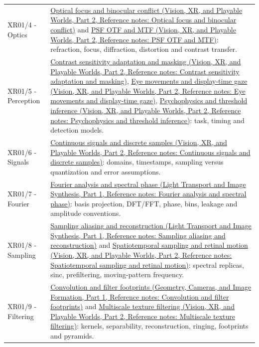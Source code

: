 {\begin{longtable}[]{@{}
  >{\raggedright\arraybackslash}p{}
  >{\raggedright\arraybackslash}p{}@{}}
XR01/4 - Optics & \href{../07-Vision-XR-and-Playable-Worlds-P02/main.pdf\#appendix-f90cee1be7a4}{Optical focus and binocular conflict (Vision, XR, and Playable Worlds, Part 2, Reference notes: Optical focus and binocular conflict)} and \href{../07-Vision-XR-and-Playable-Worlds-P02/main.pdf\#appendix-8b76b0efd27f}{PSF OTF and MTF (Vision, XR, and Playable Worlds, Part 2, Reference notes: PSF OTF and MTF)}: refraction, focus, diffraction, distortion and contrast transfer. \\
XR01/5 - Perception & \href{../07-Vision-XR-and-Playable-Worlds-P02/main.pdf\#appendix-b3aa9e8e01ad}{Contrast sensitivity adaptation and masking (Vision, XR, and Playable Worlds, Part 2, Reference notes: Contrast sensitivity adaptation and masking)}, \href{../07-Vision-XR-and-Playable-Worlds-P02/main.pdf\#appendix-a6f2c4fe1996}{Eye movements and display-time gaze (Vision, XR, and Playable Worlds, Part 2, Reference notes: Eye movements and display-time gaze)}, \href{../07-Vision-XR-and-Playable-Worlds-P02/main.pdf\#appendix-1759f03e8ce7}{Psychophysics and threshold inference (Vision, XR, and Playable Worlds, Part 2, Reference notes: Psychophysics and threshold inference)}: task, timing and detection models. \\
XR01/6 - Signals & \href{../07-Vision-XR-and-Playable-Worlds-P02/main.pdf\#appendix-1077ea8fc737}{Continuous signals and discrete samples (Vision, XR, and Playable Worlds, Part 2, Reference notes: Continuous signals and discrete samples)}: domains, timestamps, sampling versus quantization and error assumptions. \\
XR01/7 - Fourier & \href{../04-Light-Transport-and-Image-Synthesis-P01/main.pdf\#appendix-b60686ba06a1}{Fourier analysis and spectral phase (Light Transport and Image Synthesis, Part 1, Reference notes: Fourier analysis and spectral phase)}: basis projection, DFT/FFT, phase, bins, leakage and amplitude conventions. \\
XR01/8 - Sampling & \href{../04-Light-Transport-and-Image-Synthesis-P01/main.pdf\#appendix-6a7869dd79a6}{Sampling aliasing and reconstruction (Light Transport and Image Synthesis, Part 1, Reference notes: Sampling aliasing and reconstruction)} and \href{../07-Vision-XR-and-Playable-Worlds-P02/main.pdf\#appendix-70895739febb}{Spatiotemporal sampling and retinal motion (Vision, XR, and Playable Worlds, Part 2, Reference notes: Spatiotemporal sampling and retinal motion)}: spectral replicas, sinc, prefiltering, moving-pattern frequency. \\
XR01/9 - Filtering & \href{../03-Geometry-Cameras-and-Image-Formation-P01/main.pdf\#appendix-d5b3c692d9f0}{Convolution and filter footprints (Geometry, Cameras, and Image Formation, Part 1, Reference notes: Convolution and filter footprints)} and \href{../07-Vision-XR-and-Playable-Worlds-P02/main.pdf\#appendix-b677a85ba76f}{Multiscale texture filtering (Vision, XR, and Playable Worlds, Part 2, Reference notes: Multiscale texture filtering)}: kernels, separability, reconstruction, ringing, footprints and pyramids. \\

\end{longtable}}
